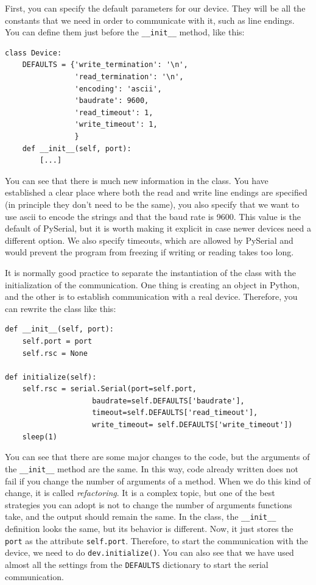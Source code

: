 First, you can specify the default parameters for our device. They will be all the constants that we need in order to communicate with it, such as line endings. You can define them just before the \texttt{__init__} method, like this:

\begin{verbatim}
class Device:
    DEFAULTS = {'write_termination': '\n',
                'read_termination': '\n',
                'encoding': 'ascii',
                'baudrate': 9600,
                'read_timeout': 1,
                'write_timeout': 1,
                }
    def __init__(self, port):
        [...]
\end{verbatim}

You can see that there is much new information in the class. You have established a clear place where both the read and write line endings are specified (in principle they don't need to be the same), you also specify that we want to use ascii to encode the strings and that the baud rate is 9600. This value is the default of PySerial, but it is worth making it explicit in case newer devices need a different option. We also specify timeouts, which are allowed by PySerial and would prevent the program from freezing if writing or reading takes too long.

It is normally good practice to separate the instantiation of the class with the initialization of the communication. One thing is creating an object in Python, and the other is to establish communication with a real device. Therefore, you can rewrite the class like this:

\begin{verbatim}
def __init__(self, port):
    self.port = port
    self.rsc = None

def initialize(self):
    self.rsc = serial.Serial(port=self.port,
                    baudrate=self.DEFAULTS['baudrate'],
                    timeout=self.DEFAULTS['read_timeout'],
                    write_timeout= self.DEFAULTS['write_timeout'])
    sleep(1)
\end{verbatim}

You can see that there are some major changes to the code, but the arguments of the \texttt{__init__} method are the same. In this way, code already written does not fail if you change the number of arguments of a method. When we do this kind of change, it is called \emph{refactoring}. It is a complex topic, but one of the best strategies you can adopt is not to change the number of arguments functions take, and the output should remain the same. In the class, the \texttt{__init__} definition looks the same, but its behavior is different. Now, it just stores the \texttt{port} as the attribute \texttt{self.port}. Therefore, to start the communication with the device, we need to do \texttt{dev.initialize()}. You can also see that we have used almost all the settings from the \texttt{DEFAULTS} dictionary to start the serial communication.

